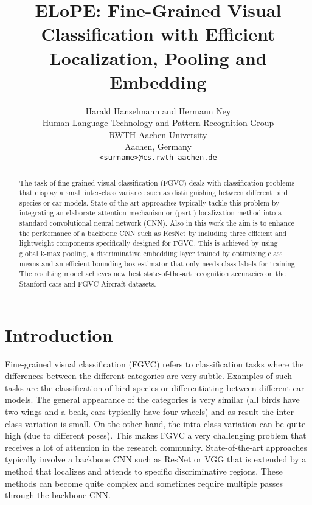 \documentclass[10pt,twocolumn,letterpaper]{article}
\begin{document}
\title{ELoPE: Fine-Grained Visual Classification with Efficient Localization, Pooling and Embedding}

\author{Harald Hanselmann and Hermann Ney \\
Human Language Technology and Pattern Recognition Group\\
RWTH Aachen University\\
Aachen, Germany\\
{\tt\small <surname>@cs.rwth-aachen.de}
}


\maketitle
\ifwacvfinal\thispagestyle{empty}\fi

\begin{abstract}
The task of fine-grained visual classification (FGVC) deals with classification problems that display a small inter-class variance such as distinguishing between different bird species or car models. State-of-the-art approaches typically tackle this problem by integrating an elaborate attention mechanism or (part-) localization method into a standard convolutional neural network (CNN). Also in this work the aim is to enhance the performance of a backbone CNN such as ResNet by including three efficient and lightweight components specifically designed for FGVC. This is achieved by using global k-max pooling, a discriminative embedding layer trained by optimizing class means and an efficient bounding box estimator that only needs class labels for training. The resulting model achieves new best state-of-the-art recognition accuracies on the Stanford cars and FGVC-Aircraft datasets.
\end{abstract}

\section{Introduction}
Fine-grained visual classification (FGVC) refers to classification tasks where the differences between the different categories are very subtle. Examples of such tasks are the classification of bird species or differentiating between different car models. The general appearance of the categories is very similar (\eg all birds have two wings and a beak, cars typically have four wheels) and as result the inter-class variation is small. On the other hand, the intra-class variation can be quite high (\eg due to different poses). This makes FGVC a very challenging problem that receives a lot of attention in the research community. State-of-the-art approaches typically involve a backbone CNN such as ResNet \cite{he2016deep} or VGG \cite{simonyan2014very} that is extended by a method that localizes and attends to specific discriminative regions. These methods can become quite complex and sometimes require multiple passes through the backbone CNN.
\end{document}
